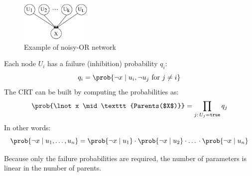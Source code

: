 \begin{figure}[h]
    \centering
    \includegraphics[width=0.3\textwidth]{img/_noisy_or_example.pdf}
    \caption{Example of noisy-OR network}
\end{figure}

Each node $U_i$ has a failure (inhibition) probability $q_i$:
\[ q_i = \prob{\lnot x \mid u_i, \lnot u_j \text{ for } j \neq i} \]
The CRT can be built by computing the probabilities as:
\[ \prob{\lnot x \mid \texttt{Parents($X$)}} = \prod_{j:\, U_j = \texttt{true}} q_j \]
In other words:
\[ \prob{\lnot x \mid u_1, \dots, u_n} = 
    \prob{\lnot x \mid u_1} \cdot \prob{\lnot x \mid u_2} \cdot \text{\dots} \cdot \prob{\lnot x \mid u_n} \]

Because only the failure probabilities are required, the number of parameters is linear in the number of parents.


